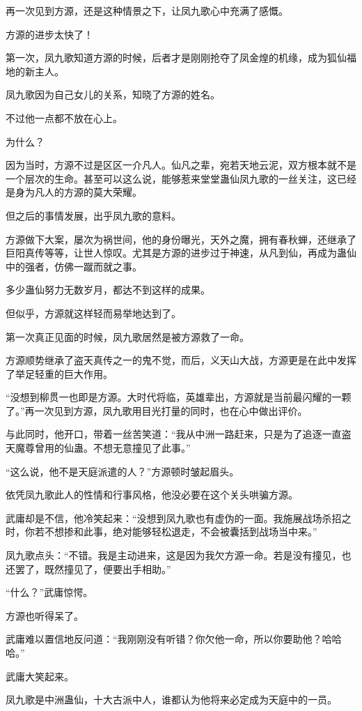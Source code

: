 \begin{this_body}
再一次见到方源，还是这种情景之下，让凤九歌心中充满了感慨。

方源的进步太快了！

第一次，凤九歌知道方源的时候，后者才是刚刚抢夺了凤金煌的机缘，成为狐仙福地的新主人。

凤九歌因为自己女儿的关系，知晓了方源的姓名。

不过他一点都不放在心上。

为什么？

因为当时，方源不过是区区一介凡人。仙凡之辈，宛若天地云泥，双方根本就不是一个层次的生命。甚至可以这么说，能够惹来堂堂蛊仙凤九歌的一丝关注，这已经是身为凡人的方源的莫大荣耀。

但之后的事情发展，出乎凤九歌的意料。

方源做下大案，屡次为祸世间，他的身份曝光，天外之魔，拥有春秋蝉，还继承了巨阳真传等等，让世人惊叹。尤其是方源的进步过于神速，从凡到仙，再成为蛊仙中的强者，仿佛一蹴而就之事。

多少蛊仙努力无数岁月，都达不到这样的成果。

但似乎，方源就这样轻而易举地达到了。

第一次真正见面的时候，凤九歌居然是被方源救了一命。

方源顺势继承了盗天真传之一的鬼不觉，而后，义天山大战，方源更是在此中发挥了举足轻重的巨大作用。

“没想到柳贯一也即是方源。大时代将临，英雄辈出，方源就是当前最闪耀的一颗了。”再一次见到方源，凤九歌用目光打量的同时，也在心中做出评价。

与此同时，他开口，带着一丝苦笑道：“我从中洲一路赶来，只是为了追逐一直盗天魔尊曾用的仙蛊。不想无意撞见了此事。”

“这么说，他不是天庭派遣的人？”方源顿时皱起眉头。

依凭凤九歌此人的性情和行事风格，他没必要在这个关头哄骗方源。

武庸却是不信，他冷笑起来：“没想到凤九歌也有虚伪的一面。我施展战场杀招之时，你若不想掺和此事，绝对能够轻松退走，不会被囊括到战场当中来。”

凤九歌点头：“不错。我是主动进来，这是因为我欠方源一命。若是没有撞见，也还罢了，既然撞见了，便要出手相助。”

“什么？”武庸惊愕。

方源也听得呆了。

武庸难以置信地反问道：“我刚刚没有听错？你欠他一命，所以你要助他？哈哈哈。”

武庸大笑起来。

凤九歌是中洲蛊仙，十大古派中人，谁都认为他将来必定成为天庭中的一员。


\end{this_body}
